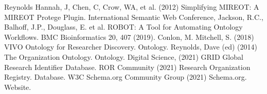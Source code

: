 \documentclass[letterpaper,10pt,english]{sphinxmanual}
\begin{document}
\begin{sphinxthebibliography}{Reynolds}
\sphinxAtStartPar
Hannah, J, Chen, C, Crow, WA, et al. (2012) Simplifying MIREOT: A
MIREOT Protege Plugin. International Semantic Web Conference,
\sphinxAtStartPar
Jackson, R.C., Balhoff, J.P., Douglass, E. et al. ROBOT: A Tool
for Automating Ontology Workflows. BMC Bioinformatics 20, 407 (2019).
\sphinxAtStartPar
Conlon, M. Mitchell, S. (2018) VIVO Ontology for Researcher Discovery.
Ontology.
\sphinxAtStartPar
Reynolds, Dave (ed) (2014) The Organization Ontology.
Ontology.  
\sphinxAtStartPar
Digital Science, (2021) GRID Global Research Identifier Database.
\sphinxAtStartPar
ROR Community (2021) Research Organization Registry. Database.
\sphinxAtStartPar
W3C Schema.org Community Group (2021) Schema.org. Website.
\end{sphinxthebibliography}



\renewcommand{\indexname}{Index}
\printindex
\end{document}
